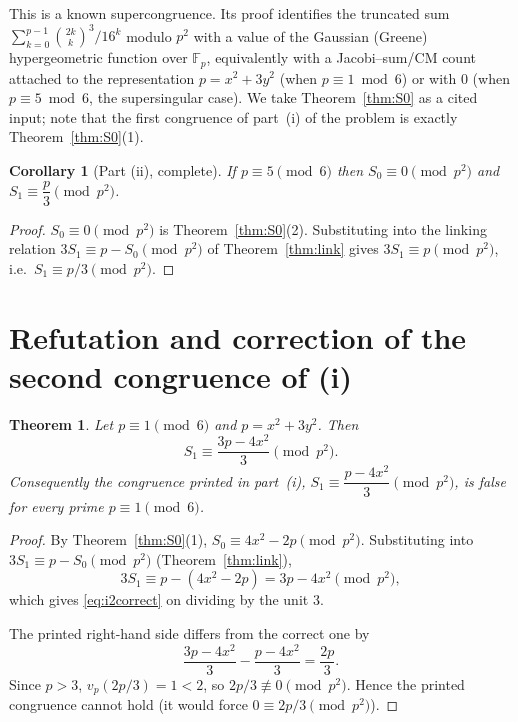 \documentclass[12pt]{article}
\newtheorem{theorem}{Theorem}
\newtheorem{corollary}{Corollary}
\theoremstyle{remark}
\begin{document}
This is a known supercongruence.  Its proof identifies the truncated sum
$\sum_{k=0}^{p-1}\binom{2k}{k}^3/16^k$ modulo $p^2$ with a value of the
Gaussian (Greene) hypergeometric function over $\mathbb F_p$, equivalently with
a Jacobi--sum/CM count attached to the representation $p=x^2+3y^2$ (when
$p\equiv1\bmod 6$) or with $0$ (when $p\equiv5\bmod6$, the supersingular case).
We take Theorem~\ref{thm:S0} as a cited input; note that the first congruence
of part~(i) of the problem is exactly Theorem~\ref{thm:S0}(1).

\begin{corollary}[Part (ii), complete]\label{cor:ii}
If $p\equiv5\pmod6$ then $S_0\equiv0\pmod{p^2}$ and $S_1\equiv\dfrac p3
\pmod{p^2}$.
\end{corollary}

\begin{proof}
$S_0\equiv0\pmod{p^2}$ is Theorem~\ref{thm:S0}(2).  Substituting into the
linking relation $3S_1\equiv p-S_0\pmod{p^2}$ of Theorem~\ref{thm:link} gives
$3S_1\equiv p\pmod{p^2}$, i.e.\ $S_1\equiv p/3\pmod{p^2}$.
\end{proof}

\section{Refutation and correction of the second congruence of (i)}

\begin{theorem}\label{thm:i2}
Let $p\equiv1\pmod6$ and $p=x^2+3y^2$.  Then
\begin{equation}\label{eq:i2correct}
S_1\equiv\frac{3p-4x^2}{3}\pmod{p^2}.
\end{equation}
Consequently the congruence printed in part~(i),
$S_1\equiv\dfrac{p-4x^2}{3}\pmod{p^2}$, is \emph{false} for every prime
$p\equiv1\pmod6$.
\end{theorem}

\begin{proof}
By Theorem~\ref{thm:S0}(1), $S_0\equiv4x^2-2p\pmod{p^2}$.  Substituting into
$3S_1\equiv p-S_0\pmod{p^2}$ (Theorem~\ref{thm:link}),
\[
3S_1\equiv p-(4x^2-2p)=3p-4x^2\pmod{p^2},
\]
which gives \eqref{eq:i2correct} on dividing by the unit $3$.

The printed right-hand side differs from the correct one by
\[
\frac{3p-4x^2}{3}-\frac{p-4x^2}{3}=\frac{2p}{3}.
\]
Since $p>3$, $v_p(2p/3)=1<2$, so $2p/3\not\equiv0\pmod{p^2}$.  Hence the printed
congruence cannot hold (it would force $0\equiv2p/3\pmod{p^2}$).
\end{proof}
\end{document}
